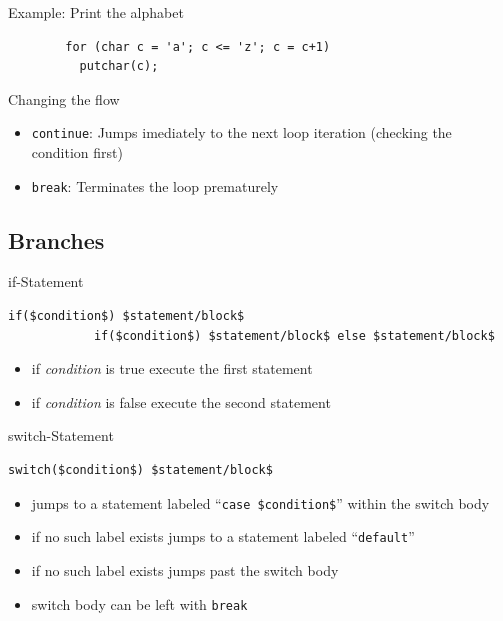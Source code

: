 \documentclass[english,compress]{beamer}
\begin{document}
\begin{frame}[fragile]{Example: Print the alphabet}
	\begin{lstlisting}
		for (char c = 'a'; c <= 'z'; c = c+1)
		  putchar(c);
	\end{lstlisting}
\end{frame}

\begin{frame}{Changing the flow}
	\begin{itemize}
		\item \lstinline|continue|: Jumps imediately to the next loop iteration (checking the condition first)
		\item \lstinline|break|: Terminates the loop prematurely
	\end{itemize}
\end{frame}

\subsection{Branches}
\begin{frame}[fragile]
	\begin{block}{if-Statement}
		\begin{lstlisting}[numbers=none]
			if($condition$) $statement/block$ 
			if($condition$) $statement/block$ else $statement/block$ 
		\end{lstlisting}
		\begin{itemize}
			\item if \textit{condition} is true execute the first statement
			\item if \textit{condition} is false execute the second statement

		\end{itemize}
	\end{block}
\end{frame}

\begin{frame}[fragile]
	\begin{block}{switch-Statement}
		\begin{lstlisting}[numbers=none]
			switch($condition$) $statement/block$ 
		\end{lstlisting}
		\begin{itemize}
			\item jumps to a statement labeled ``\lstinline|case $condition$|'' within the switch body
			\item if no such label exists jumps to a statement labeled ``\lstinline|default|''
			\item if no such label exists jumps past the switch body
			\item switch body can be left with \lstinline|break|
		\end{itemize}
	\end{block}
\end{frame}
\end{document}
